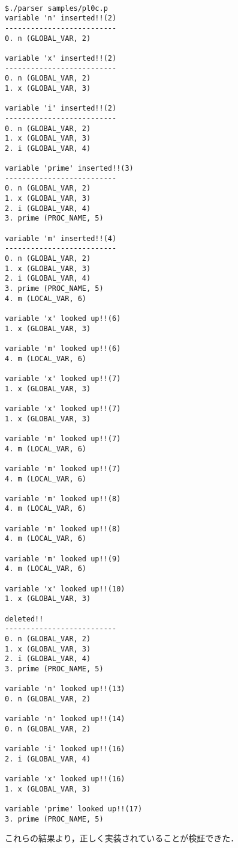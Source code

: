 \documentclass[uplatex]{jsarticle}
\begin{document}
\begin{lstlisting}[caption=pl0c.pに対するparserの実行,label=lst:ex3:result-pl0c.p]

$./parser samples/pl0c.p
variable 'n' inserted!!(2)
--------------------------
0. n (GLOBAL_VAR, 2)

variable 'x' inserted!!(2)
--------------------------
0. n (GLOBAL_VAR, 2)
1. x (GLOBAL_VAR, 3)

variable 'i' inserted!!(2)
--------------------------
0. n (GLOBAL_VAR, 2)
1. x (GLOBAL_VAR, 3)
2. i (GLOBAL_VAR, 4)

variable 'prime' inserted!!(3)
--------------------------
0. n (GLOBAL_VAR, 2)
1. x (GLOBAL_VAR, 3)
2. i (GLOBAL_VAR, 4)
3. prime (PROC_NAME, 5)

variable 'm' inserted!!(4)
--------------------------
0. n (GLOBAL_VAR, 2)
1. x (GLOBAL_VAR, 3)
2. i (GLOBAL_VAR, 4)
3. prime (PROC_NAME, 5)
4. m (LOCAL_VAR, 6)

variable 'x' looked up!!(6)
1. x (GLOBAL_VAR, 3)

variable 'm' looked up!!(6)
4. m (LOCAL_VAR, 6)

variable 'x' looked up!!(7)
1. x (GLOBAL_VAR, 3)

variable 'x' looked up!!(7)
1. x (GLOBAL_VAR, 3)

variable 'm' looked up!!(7)
4. m (LOCAL_VAR, 6)

variable 'm' looked up!!(7)
4. m (LOCAL_VAR, 6)

variable 'm' looked up!!(8)
4. m (LOCAL_VAR, 6)

variable 'm' looked up!!(8)
4. m (LOCAL_VAR, 6)

variable 'm' looked up!!(9)
4. m (LOCAL_VAR, 6)

variable 'x' looked up!!(10)
1. x (GLOBAL_VAR, 3)

deleted!!
--------------------------
0. n (GLOBAL_VAR, 2)
1. x (GLOBAL_VAR, 3)
2. i (GLOBAL_VAR, 4)
3. prime (PROC_NAME, 5)

variable 'n' looked up!!(13)
0. n (GLOBAL_VAR, 2)

variable 'n' looked up!!(14)
0. n (GLOBAL_VAR, 2)

variable 'i' looked up!!(16)
2. i (GLOBAL_VAR, 4)

variable 'x' looked up!!(16)
1. x (GLOBAL_VAR, 3)

variable 'prime' looked up!!(17)
3. prime (PROC_NAME, 5)
\end{lstlisting}
これらの結果より，正しく実装されていることが検証できた．
\end{document}

